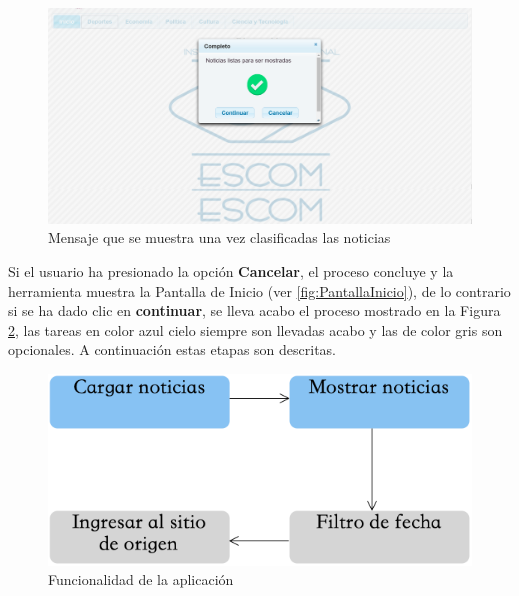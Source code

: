 \begin{figure}[H]
\centering
\includegraphics[scale=0.35]{imagenes/noticiasListasParaSerMostradas.png}
\caption{Mensaje que se muestra una vez clasificadas las noticias}
\label{fig:notClass}
\end{figure}

Si el usuario ha presionado la opción \textbf{Cancelar}, el proceso concluye y la herramienta muestra la Pantalla de Inicio (ver \ref{fig:PantallaInicio}), de lo contrario si se ha dado clic en \textbf{continuar}, se lleva acabo el proceso mostrado en la Figura \ref{fig:cp5:mostrar}, las tareas en color azul cielo siempre son llevadas acabo y las de color gris son opcionales. A continuación estas etapas son descritas.

\begin{figure}[H]
\centering
\includegraphics[scale=0.55]{imagenes/MostrarDatosApp.png}
\caption{Funcionalidad de la aplicación}
\label{fig:cp5:mostrar}
\end{figure}


